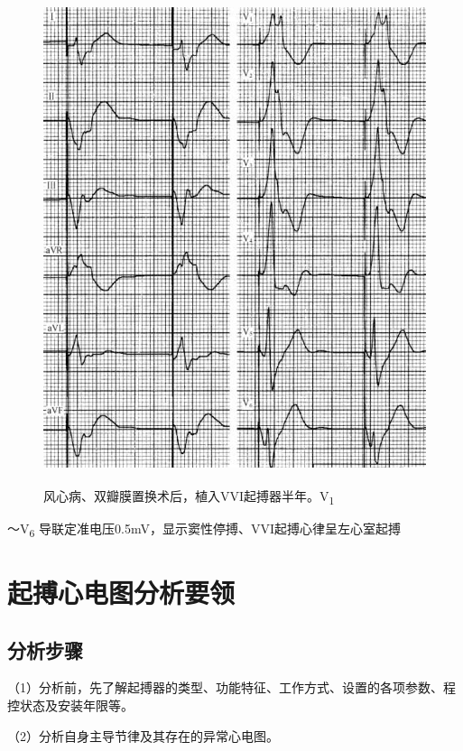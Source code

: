 \begin{figure}[!htbp]
 \centering
 \includegraphics[width=4.70833in,height=5.66667in]{./images/Image00645.jpg}
 \captionsetup{justification=centering}
 \caption{风心病、双瓣膜置换术后，植入VVI起搏器半年。V\textsubscript{1}}
 \label{fig38-42}
  \end{figure} 
～V\textsubscript{6}
导联定准电压0.5mV，显示窦性停搏、VVI起搏心律呈左心室起搏

\protect\hypertarget{text00045.htmlux5cux23subid505}{}{}

\section{起搏心电图分析要领}

\protect\hypertarget{text00045.htmlux5cux23subid506}{}{}

\subsection{分析步骤}

（1）分析前，先了解起搏器的类型、功能特征、工作方式、设置的各项参数、程控状态及安装年限等。

（2）分析自身主导节律及其存在的异常心电图。


